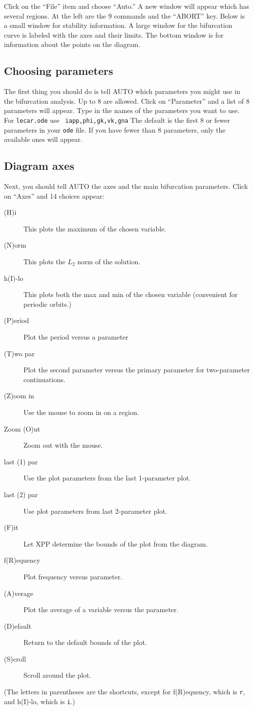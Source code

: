 \documentclass{article}
\begin{document}
Click on the ``File'' item and choose ``Auto.''  A new window will
appear which has several regions.  At the left are the 9 commands and
the ``ABORT'' key.  Below is a small window for stability information.
A large window for the bifurcation curve is labeled with the axes and
their limits.  The bottom window is for information about the points
on the diagram.

\subsection{Choosing parameters}

The first thing you should do is tell AUTO which parameters you might
use in the bifurcation analysis. Up to 8 are allowed.  Click on
``Parameter'' and a list of 8 parameters will appear.  Type in the
names of the parameters you want to use.  For {\tt lecar.ode} use {\tt
iapp,phi,gk,vk,gna}  The default is the first 8 or fewer parameters
in your {\tt ode} file. If you have fewer than 8 parameters, only the
available ones will appear.

\subsection{Diagram axes}

Next, you should tell AUTO the axes and the main bifurcation
parameters.  Click on ``Axes'' and 14 choices appear:
\begin{description}
\item[(H)i] This plots the maximum of the chosen variable.
\item[(N)orm]  This plots the $L_2$ norm of the solution.
\item[h(I)-lo] This plots both the max and min of the chosen variable
(convenient for periodic orbits.)
\item[(P)eriod] Plot the period versus a parameter
\item[(T)wo par] Plot the second parameter versus the primary
parameter for two-parameter continuations.
\item[(Z)oom in] Use the mouse to zoom in on a region.
\item[Zoom (O)ut] Zoom out with the mouse.
\item[last (1) par] Use the plot parameters from the last 1-parameter
plot.
\item[last (2) par] Use plot parameters from last 2-parameter plot.
\item[(F)it] Let XPP determine the bounds of the plot from the diagram.
\item[f(R)equency] Plot frequency versus parameter.
\item[(A)verage] Plot the average of a variable versus the parameter.
\item[(D)efault] Return to the default bounds of the plot.
\item[(S)croll] Scroll around the plot.
\end{description}
(The letters in parentheses are the shortcuts, except for
f(R)equency, which is {\tt r}, and h(I)-lo, which is {\tt i}.)
\end{document}
